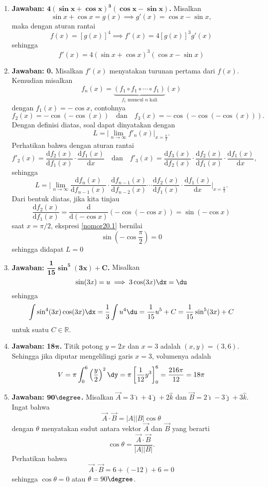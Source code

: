 \begin{enumerate}
\item \textbf{Jawaban: $\boldsymbol{4(\sin x+\cos x)^3(\cos x-\sin x)}$.} Misalkan \[\sin x + \cos x = g(x)\implies g'(x) = \cos x - \sin x,\]maka dengan aturan rantai \[f(x) = [g(x)]^4 \implies f'(x) = 4[g(x)]^3g'(x)\]sehingga\[f'(x) = 4(\sin x +\cos x)^3(\cos x - \sin x)\]

\item \textbf{Jawaban: 0.} Misalkan $f'(x)$ menyatakan turunan pertama dari $f(x)$. Kemudian misalkan $$f_n(x) = \underbrace{(f_1\circ f_1\circ\cdots\circ f_1)}_{\text{$f_1$ muncul $n$ kali}}(x)$$dengan $f_1(x) = -\cos x$, contohnya $$f_2(x) = -\cos(-\cos(x))\quad\text{dan}\quad f_3(x) = -\cos(-\cos(-\cos(x))).$$ Dengan definisi diatas, soal dapat dinyatakan dengan $$L = \biggl\lvert\lim_{n\to\infty}f'_n(x)\biggr\rvert_{x=\frac{\pi}{2}}.$$Perhatikan bahwa dengan aturan rantai $$f'_2(x) = \frac{\text{d}f_2(x)}{\text{d}f_1(x)}\cdot\frac{\text{d}f_1(x)}{\text{d}x}\quad\text{dan}\quad f'_3(x) = \frac{\text{d}f_3(x)}{\text{d}f_2(x)}\cdot\frac{\text{d}f_2(x)}{\text{d}f_1(x)}\cdot\frac{\text{d}f_1(x)}{\text{d}x},$$sehingga $$L = \biggl\lvert\lim_{n\to\infty}\frac{\text{d}f_n(x)}{\text{d}f_{n-1}(x)}\cdot\frac{\text{d}f_{n-1}(x)}{\text{d}f_{n-2}(x)}\cdots\frac{\text{d}f_2(x)}{\text{d}f_1(x)}\cdot\frac{\text{d}f_1(x)}{\text{d}x}\biggr\rvert_{x=\frac{\pi}{2}}.$$Dari bentuk diatas, jika kita tinjau \begin{equation}\label{nomor20.1}\frac{\text{d}f_2(x)}{\text{d}f_1(x)} = \frac{\text{d}}{\text{d}(-\cos x)}(-\cos(-\cos x)) = \sin(-\cos x)\end{equation}saat $x={\pi}/{2}$, ekspresi \eqref{nomor20.1} bernilai \[\sin\left(-\cos\frac{\pi}{2}\right) = 0\]sehingga didapat $L = 0$

\item \textbf{Jawaban: $\boldsymbol{\dfrac{1}{15}}\boldsymbol{\sin^5(3x) + C}$.} Misalkan \[\sin(3x) = u\implies 3\cos(3x)\dx = \du\]sehingga\[\int \sin^4(3x)\cos(3x)\dx = \frac{1}{3}\int u^4\du = \frac{1}{15}u^5 + C = \frac{1}{15}\sin^5(3x)+C\]untuk suatu $C\in\mathbb{R}$.

\item \textbf{Jawaban: 18$\boldsymbol{\pi}$.} Titik potong $y = 2x$ dan $x=3$ adalah $(x,y) = (3,6)$. Sehingga jika diputar mengelilingi garis $x=3$, volumenya adalah \[V = \pi\int_{0}^{6} \left(\frac{y}{2}\right)^2\dy = \pi\left[\frac{1}{12}y^3\right]_0^6 = \frac{216\pi}{12} =18\pi\]

\item \textbf{Jawaban: $\boldsymbol{90\degree}$.} Misalkan $\vec{A} = 3\hat{\imath} + 4\hat{\jmath} + 2\hat{k}$ dan $\vec{B} = 2\hat{\imath} - 3\hat{\jmath} + 3\hat{k}$. Ingat bahwa \[\vec{A}\cdot\vec{B} = \lvert A\rvert\lvert B\rvert\cos{\theta}\]dengan $\theta$ menyatakan sudut antara vektor $\vec{A}$ dan $\vec{B}$ yang berarti \[\cos\theta = \frac{\vec{A}\cdot\vec{B}}{\lvert A\rvert\lvert B\rvert}.\]Perhatikan bahwa \[\vec{A} \cdot \vec{B} = 6 + (-12) + 6 = 0\]sehingga $\cos\theta = 0$ atau $\theta = 90\degree$.


\end{enumerate}
